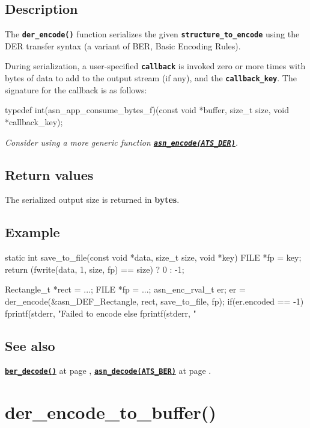 \documentclass[english,oneside,12pt]{book}
\newcommand{\apisection}[2]{\clearpage\section{\label{#1}#2}}
\newcommand{\api}[2]{\hyperref[#1]{\code{#2}}}
\newcommand{\seealso}[2]{\api{#1}{#2} at page \pageref{#1}}
\newcommand{\code}[1]{\texttt{\textbf{\lstinline{#1}}}}
\begin{document}
\subsection*{Description}

The \code{der_encode()} function serializes the given \code{structure_to_encode} using the DER transfer syntax (a variant of BER, Basic Encoding Rules).

During serialization, a user-specified \code{callback} is invoked zero
or more times with bytes of data to add to the output stream (if any), and
the \code{callback_key}. The signature for the callback is as follows:

\begin{signature}
typedef int(asn_app_consume_bytes_f)(const void *buffer, size_t size, void *callback_key);
\end{signature}

\noindent\emph{Consider using a more generic function \api{sec:asn_encode}{asn_encode(ATS_DER)}.}

\subsection*{Return values}


The serialized output size is returned in \textbf{bytes}.

\subsection*{Example}
\begin{example}
static int
save_to_file(const void *data, size_t size, void *key) {
    FILE *fp = key;
    return (fwrite(data, 1, size, fp) == size) ? 0 : -1;
}

Rectangle_t *rect = ...;
FILE *fp = ...;
asn_enc_rval_t er;
er = der_encode(&asn_DEF_Rectangle, rect, save_to_file, fp);
if(er.encoded == -1) {
   fprintf(stderr, "Failed to encode %
} else {
   fprintf(stderr, "%
}
\end{example}

\subsection*{See also}
\seealso{sec:ber_decode}{ber_decode()},
\seealso{sec:asn_decode}{asn_decode(ATS_BER)}.

\apisection{sec:der_encode_to_buffer}{der\_encode\_to\_buffer()}
\end{document}
